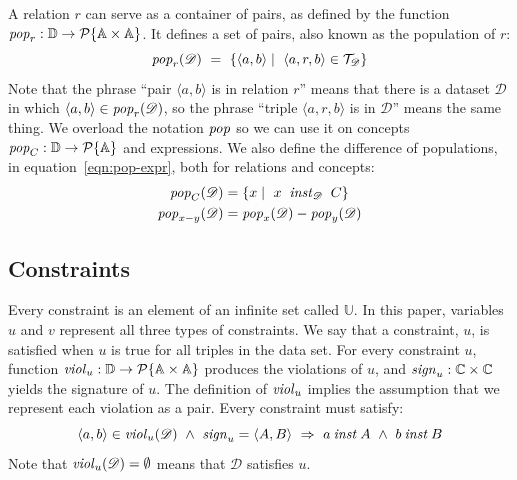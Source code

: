 \documentclass[runningheads]{llncs}
\newcommand{\id}[1]{\text{\it #1\/}}
\newcommand{\popF}[1]{\id{pop}_{#1}}
\newcommand{\pop}[2]{\popF{#1}(#2)}
\newcommand{\instance}{\mathbin{\id{inst}}}
\newcommand{\viol}[2]{\violC{#1}(#2)}
\newcommand{\violC}[1]{\id{viol}_{#1}}
\newcommand{\sign}[1]{\id{sign}_{#1}}
\newcommand{\powerset}[1]{\cal{P}\{#1\}}
\newcommand{\declare}[3]{\id{#1}_{\pair{#2}{#3}}}
\newcommand{\pair}[2]{\langle{#1},{#2}\rangle}
\newcommand{\Pair}[2]{#1\times#2}
\newcommand{\triple}[3]{\langle{#1},{#2},{#3}\rangle}
\newcommand{\Atoms}{\mathbb{A}}
\newcommand{\Concepts}{\mathbb{C}}
\newcommand{\triples}{\mathcal{T}}
\newcommand{\Constraints}{\mathbb{U}}
\newcommand{\dataset}{\mathscr{D}}
\newcommand{\Dataset}{\mathbb{D}}
\begin{document}
   A relation $r$ can serve as a container of pairs,
   as defined by the function $\popF{r}:\Dataset\rightarrow\powerset{\Pair{\Atoms}{\Atoms}}$.
   It defines a set of pairs, also known as the population of $r$:
\begin{equation}
   \pop{r}{\dataset}\ =\ \{ \pair{a}{b}\mid\ \triple{a}{r}{b}\in\triples_{\dataset}\}
\label{eqn:pop-rel}
\end{equation}
   Note that the phrase ``pair $\pair{a}{b}$ is in relation $r$'' means that there is a dataset $\dataset$ in which $\pair{a}{b}\in\pop{r}{\dataset}$,
   so the phrase ``triple $\triple{a}{r}{b}$ is in $\dataset$'' means the same thing.
%
   We overload the notation $\popF{}$ so we can use it on concepts $\popF{C}:\Dataset\rightarrow\powerset{\Atoms}$
   and expressions. We also define the difference of populations, in equation~\ref{eqn:pop-expr}, both for relations and concepts:
\begin{align}
   \pop{C}{\dataset}&= \{ x\mid\ x\ \instance_{\dataset}\ C\}
\label{eqn:pop-concept}\\
   \pop{x-y}{\dataset}&= \pop{x}{\dataset} - \pop{y}{\dataset}
\label{eqn:pop-expr}
\end{align}

\subsection{Constraints}
\label{sct:Constraints}
   Every constraint is an element of an infinite set called $\Constraints$.
   In this paper, variables $u$ and $v$ represent all three types of constraints.
   We say that a constraint, $u$, is satisfied when $u$ is true for all triples in the data set.
   For every constraint $u$, function $\violC{u}:\Dataset\rightarrow\powerset{\Pair{\Atoms}{\Atoms}}$ produces the violations of $u$,
   and $\sign{u}:\Pair{\Concepts}{\Concepts}$ yields the signature of $u$.
   The definition of $\violC{u}$ implies the assumption that we represent each violation as a pair.
   Every constraint must satisfy:
\begin{equation}
   \pair{a}{b}\in\viol{u}{\dataset}\ \wedge\ \sign{u}=\pair{A}{B}\ \Rightarrow\ a\instance A\ \wedge\ b\instance B
\label{eqn:wellTypedViolation}
\end{equation}
   Note that $\viol{u}{\dataset}=\emptyset$ means that $\dataset$ satisfies $u$.
\end{document}
